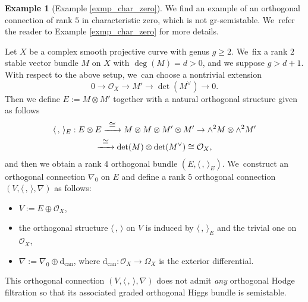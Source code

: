 \documentclass[11pt]{article}
\numberwithin{equation}{section}
\newcommand\To[1]{\mathchoice{\xrightarrow{\textstyle\kern4pt#1\kern3pt}}{\stackrel{#1}{\to}}{}{}}
\newcommand{\grsemistable}{gr\nobreakdash-semi\-stable\xspace}
\theoremstyle{plain}
\theoremstyle{definition}
\newtheorem{examp}[thm]{Example}
\begin{document}
\begin{examp}[Example \ref{exmp_char_zero}]
We find an example of an orthogonal connection of rank $5$ in characteristic zero, which is not \grsemistable. We~refer the reader to Example \ref{exmp_char_zero} for more details.

Let $X$ be a complex smooth projective curve with genus $g \geq 2$. We~fix a rank $2$ stable vector bundle $M$ on $X$ with $\deg(M)=d>0$, and we suppose $g > d+1$. With respect to the above setup, we~can choose a nontrivial extension
\[
0 \to \mathcal{O}_X \to M' \to \det(M^{\vee}) \to 0.
\]
Then we define $E := M \otimes M'$ together with a natural orthogonal structure given as follows
\begin{multline*}
\langle \,, \, \rangle_E : E \otimes E \To{\cong} M \otimes M \otimes M' \otimes M' \to \wedge^2 M \otimes \wedge^2 M' \\
\To{\cong} \det(M) \otimes \det(M^{\vee}) \cong \mathcal{O}_X,
\end{multline*}
and then we obtain a rank $4$ orthogonal bundle $(E, \langle \,, \, \rangle_E)$. We~construct an orthogonal connection $\nabla_0$ on $E$ and define a rank $5$ orthogonal connection $(V, \langle \,, \, \rangle, \nabla)$ as follows:
\begin{itemize}
\item $V:= E \oplus \mathcal{O}_X$,
\item the orthogonal structure $\langle \,, \, \rangle$ on $V$ is induced by $\langle \,, \, \rangle_E$ and the trivial one on $\mathcal{O}_X$,
\item $\nabla:=\nabla_0 \oplus \mathrm{d}_\mathrm{can}$, where $\mathrm{d}_\mathrm{can}: \mathcal{O}_X \to \Omega_X$ is the exterior differential.
\end{itemize}
This orthogonal connection $(V, \langle \,, \, \rangle, \nabla)$ does not admit \emph{any} orthogonal Hodge filtration so that its associated graded orthogonal Higgs bundle is semistable.
\end{examp}
\end{document}
